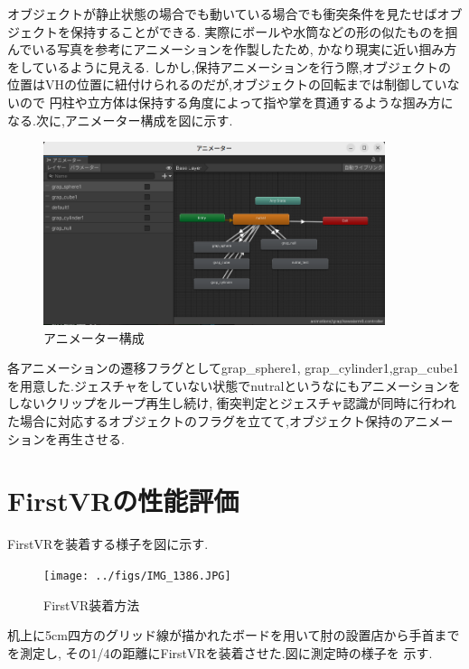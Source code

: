 \documentclass{ltjsreport}
\begin{document}
		\vspace{-15pt}
		
		オブジェクトが静止状態の場合でも動いている場合でも衝突条件を見たせばオブジェクトを保持することができる.
		実際にボールや水筒などの形の似たものを掴んでいる写真を参考にアニメーションを作製したため,
		かなり現実に近い掴み方をしているように見える.
		しかし,保持アニメーションを行う際,オブジェクトの位置はVHの位置に紐付けられるのだが,オブジェクトの回転までは制御していないので
		円柱や立方体は保持する角度によって指や掌を貫通するような掴み方になる.次に,アニメーター構成を図に示す.

		\begin{figure}[H]
		\centering
		\includegraphics[width = 10cm]{../figs/Handanimater.png}
		\caption{アニメーター構成}
		\label{fig:Handanimater}
		\end{figure}
		\vspace{-15pt}

		各アニメーションの遷移フラグとしてgrap\_sphere1,
		grap\_cylinder1,grap\_cube1を用意した.ジェスチャをしていない状態でnutralというなにもアニメーションをしないクリップをループ再生し続け,
		衝突判定とジェスチャ認識が同時に行われた場合に対応するオブジェクトのフラグを立てて,オブジェクト保持のアニメーションを再生させる.

	\section{FirstVRの性能評価}
		FirstVRを装着する様子を図に示す.
		\begin{figure}[H]
		\centering
		\texttt{[image: ../figs/IMG\_1386.JPG]}
		\caption{FirstVR装着方法}
		\label{fig:FirsrVRfit}
		\end{figure}
		\vspace{-15pt}
		机上に5cm四方のグリッド線が描かれたボードを用いて肘の設置店から手首までを測定し,
		その1/4の距離にFirstVRを装着させた.図に測定時の様子を
		示す.
\end{document}
